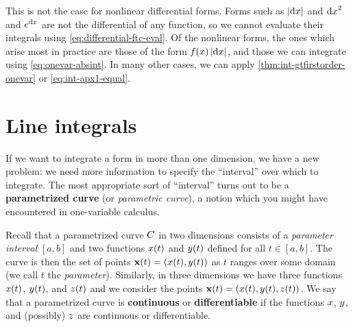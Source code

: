 \documentclass[12pt]{amsart}
\begin{document}
This is not the case for nonlinear differential forms.
Forms such as $|{\mathrm{d} x}|$ and ${\mathrm{d} x}^2$ and $e^{\mathrm{d} x}$ are not the differential of any function, so we cannot evaluate their integrals using \cref{eq:differential-ftc-eval}.
Of the nonlinear forms, the ones which arise most in practice are those of the form $f(x)\,|{\mathrm{d} x}|$, and those we can integrate using \cref{eq:onevar-absint}.
In many other cases, we can apply \cref{thm:int-gtfirstorder-onevar} or \cref{eq:int-apx1-equal}.


\section{Line integrals}
\label{sec:line-integrals}

If we want to integrate a form in more than one dimension, we have a new problem: we need more information to specify the ``interval'' over which to integrate.
The most appropriate sort of ``interval'' turns out to be a \textbf{parametrized curve} (or \emph{parametric curve}), a notion which you might have encountered in one-variable calculus.

Recall that a parametrized curve $C$ in two dimensions consists of a \emph{parameter interval} $[a,b]$ and two functions $x(t)$ and $y(t)$ defined for all $t\in [a,b]$.
The curve is then the set of points $\mathbf{x}(t) = (x(t),y(t))$ as $t$ ranges over some domain (we call $t$ the \emph{parameter}).
Similarly, in three dimensions we have three functions $x(t)$, $y(t)$, and $z(t)$ and we consider the points $\mathbf{x}(t) = (x(t),y(t),z(t))$.
We say that a parametrized curve is \textbf{continuous} or \textbf{differentiable} if the functions $x$, $y$, and (possibly) $z$ are continuous or differentiable.
\end{document}

